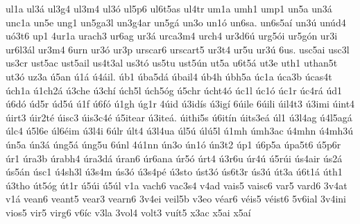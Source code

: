 {ul1a
ul3á
ul3g4
ul3m4
ul3ó
ul5p6
ul6t5as
ul4tr
um1a
umh1
ump1
un5a
un3á
unc1a
un5e
ung1
un5ga3l
un3g4ar
un5gá
un3o
un1ó
un6sa.
un6s5aí
un3ú
unúd4
uó3t6
up1
4ur1a
urach3
ur6ag
ur3á
urca3m4
urch4
ur3d6ú
urg5ói
ur5gón
ur3i
ur6l3ál
ur3m4
6urn
ur3ó
ur3p
urscar6
urscart5
ur3t4
ur5u
ur3ú
6us.
usc5ai
usc3l
us3cr
ust5ac
ust5ail
us4t3al
us3tó
us5tu
ust5ún
ut5a
u6t5á
ut3e
uth1
uthan5t
ut3ó
uz3a
ú5an
ú1á
ú4áil.
úb1
úba5dá
úbail4
úb4h
úbh5a
úc1a
úca3b
úcas4t
úch1a
ú1ch2á
ú3che
ú3chí
úch5l
úch5óg
ú5chr
úcht4ó
úc1l
úc1ó
úc1r
úc4rá
úd1
ú6dó
úd5r
úd5ú
ú1f
ú6fó
ú1gh
úg1r
4úid
ú3idís
ú3igí
6úile
6úili
úil4t3
ú3imi
úint4
úirt3
úir2té
úisc3
úis3c4é
ú5itear
ú3iteá.
úithi5s
ú6itín
úits3eá
úl1
ú3l4ag
ú4l5agá
úlc4
ú5l6e
úl6éim
ú3l4i
6úlr
últ4
ú3l4ua
úl5ú
úlú5l
ú1mh
úmh3ac
ú4mhn
ú4mh3ú
ún5a
ún3á
úng5á
úng5u
6únl
4ú1nn
ún3o
ún1ó
ún3t2
úp1
ú6p5a
úpa5t6
ú5p6r
úr1
úra3b
úrabh4
úra3dá
úran6
úr6ana
úr5ó
úrt4
ú3r6u
úr4ú
ú5rúi
ús4air
ús2á
ús5án
úsc1
ú4sh3l
ú3s4m
ús3ó
ú3s4pé
ú3sto
úst3ó
ús6t3r
ús3ú
út3a
ú6t1á
úth1
ú3tho
út5óg
út1r
ú5úi
ú5úl
v1a
vach6
vac3s4
v4ad
vais5
vaisc6
var5
vard6
3v4at
v1á
vean6
veant5
vear3
vearn6
3v4ei
veil5b
v3eo
véar6
véis5
véist6
5v6ial
3v4ini
vios5
vir5
virg6
v6íc
v3la
3vol4
volt3
vuít5
x3ac
x5ai
x5aí
}

